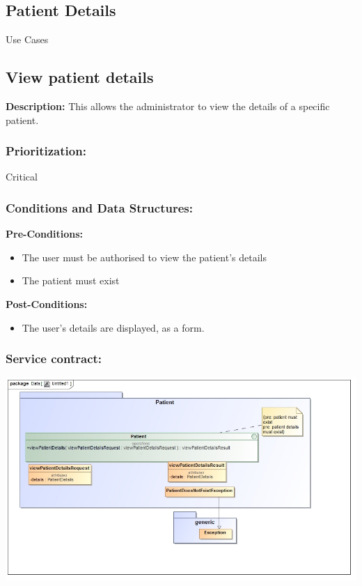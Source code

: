 \newpage
\setlength{\voffset}{-3cm}

\begin{center}
\section{\textbf{\huge{Patient Details}}}

\Large{Use Cases}
\end{center}


\subsection{View patient details}
\textbf{Description:}
This allows the administrator to view the details of a specific patient.
\subsubsection{Prioritization:}
Critical
\subsubsection{Conditions and Data Structures:}
\textbf{Pre-Conditions:}
\begin{itemize}
	\item The user must be authorised to view the patient's details
	\item The patient must exist
\end{itemize}

\textbf{Post-Conditions:}	
\begin{itemize}
	\item The user's details are displayed, as a form.
\end{itemize}

\subsubsection{Service contract:}
\includegraphics[width=1\linewidth]{./Graphics/1.jpg}
